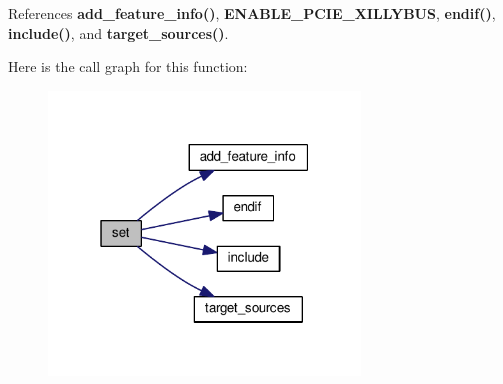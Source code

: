 References {\bf add\+\_\+feature\+\_\+info()}, {\bf E\+N\+A\+B\+L\+E\+\_\+\+P\+C\+I\+E\+\_\+\+X\+I\+L\+L\+Y\+B\+US}, {\bf endif()}, {\bf include()}, and {\bf target\+\_\+sources()}.



Here is the call graph for this function\+:
\nopagebreak
\begin{figure}[H]
\begin{center}
\leavevmode
\includegraphics[width=235pt]{d9/dbf/src_2ConnectionXillybus_2CMakeLists_8txt_a23a8fb2995b6044e7e2e68ed33622f5d_cgraph}
\end{center}
\end{figure}


